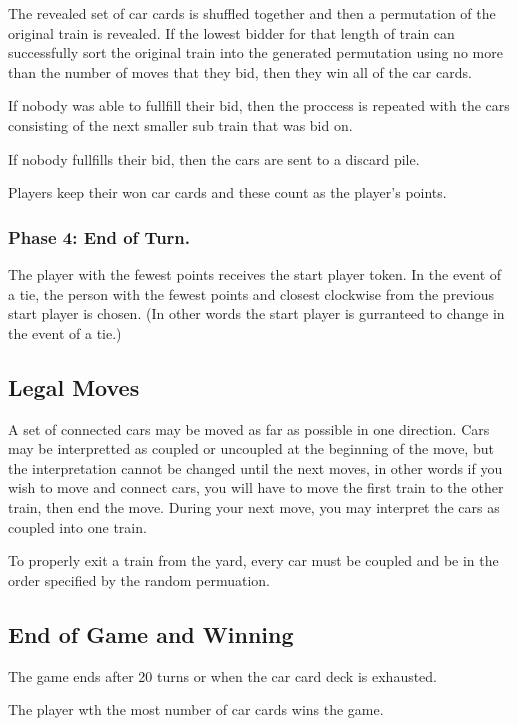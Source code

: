 \documentclass[12pt, letterpaper]{article}
\begin{document}
The revealed set of car cards is shuffled together and then a permutation of the original train is revealed. If the lowest bidder for that length of train can successfully sort the original train into the generated permutation using no more than the number of moves that they bid, then they win all of the car cards.

If nobody was able to fullfill their bid, then the proccess is repeated with the cars consisting of the next smaller sub train that was bid on.

If nobody fullfills their bid, then the cars are sent to a discard pile.

Players keep their won car cards and these count as the player's points.

\subsubsection{Phase 4: End of Turn.}

The player with the fewest points receives the start player token. In the event of a tie, the person with the fewest points and closest clockwise from the previous start player is chosen. (In other words the start player is gurranteed to change in the event of a tie.)

\subsection{Legal Moves}

A set of connected cars may be moved as far as possible in one direction. Cars may be interpretted as coupled or uncoupled at the beginning of the move, but the interpretation cannot be changed until the next moves, in other words if you wish to move and connect cars, you will have to move the first train to the other train, then end the move. During your next move, you may interpret the cars as coupled into one train.

To properly exit a train from the yard, every car must be coupled and be in the order specified by the random permuation.

\subsection{End of Game and Winning}

The game ends after 20 turns or when the car card deck is exhausted.

The player wth the most number of car cards wins the game.

\end{document}
